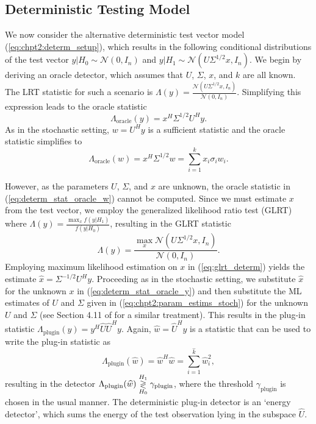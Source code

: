 \subsection{Deterministic Testing Model}\label{sec:ieee_msd_plugin_determ}
We now consider the alternative deterministic test vector model (\ref{eq:chpt2:determ_setup}), which results in the following conditional distributions of the test vector $y|H_0\sim\mathcal{N}(0,I_n)$ and $y|H_1\sim\mathcal{N}(U\Sigma^{1/2} x, I_n)$. We begin by deriving an oracle detector, which assumes that $U$, $\Sigma$, $x$, and $k$ are all known. The LRT statistic for such a scenario is $\Lambda(y) = \frac{\mathcal{N}(U\Sigma^{1/2} x, I_n)}{\mathcal{N}(0,I_n)}$. Simplifying this expression leads to the oracle statistic
\begin{equation}\label{eq:determ_stat_oracle_y}
\Lambda_{\text{oracle}}(y) = x^H\Sigma^{1/2}U^Hy.
\end{equation}
As in the stochastic setting, $w=U^Hy$ is a sufficient statistic and the oracle statistic simplifies to
\begin{equation}\label{eq:determ_stat_oracle_w}
\boxed{\Lambda_{\text{oracle}}(w) = x^H\Sigma^{1/2}w = \sum_{i=1}^kx_i\sigma_iw_i.}
\end{equation}

However, as the parameters $U$, $\Sigma$, and $x$  are unknown, the oracle statistic in (\ref{eq:determ_stat_oracle_w}) cannot be computed. Since we must estimate $x$ from the test vector, we employ the generalized likelihood ratio test (GLRT) where $\Lambda(y) = \frac{\max_x f(y|H_1)}{f(y|H_0)}$, resulting in the GLRT statistic
\begin{equation}\label{eq:glrt_determ}
\Lambda(y)=\frac{\max_x\mathcal{N}(U\Sigma^{1/2} x,I_n)}{\mathcal{N}(0,I_n)}.
\end{equation}
Employing maximum likelihood estimation on $x$ in (\ref{eq:glrt_determ}) yields the estimate $\widehat{x}=\Sigma^{-1/2}U^Hy$.  Proceeding as in the stochastic setting, we substitute $\widehat{x}$ for the unknown $x$ in (\ref{eq:determ_stat_oracle_y}) and then substitute the ML estimates of $U$ and $\Sigma$ given in (\ref{eq:chpt2:param_estims_stoch}) for the unknown $U$ and $\Sigma$ (see Section 4.11 of \cite{scharf1991statistical} for a similar treatment). This results in the plug-in statistic $\Lambda_{\text{plugin}}(y) = y^H\widehat{U}\widehat{U}^Hy$. Again, $\widehat{w}=\widehat{U}^Hy$ is a statistic that can be used to write the plug-in statistic as
\begin{equation}\label{eq:plugin_stat_determ}
\boxed{\Lambda_{\text{plugin}}(\widehat{w}) = \widehat{w}^H\widehat{w}=\sum_{i=1}^{\widehat{k}}\widehat{w}_i^2},
\end{equation}
resulting in the detector $\Lambda_{\text{plugin}}(\widehat{w}) \overset{H_1}{\underset{H_0}{\gtrless}} \gamma_{\text{plugin}}$, 
where the threshold $\gamma_{\text{plugin}}$ is chosen in the usual manner. The deterministic plug-in detector is an `energy detector', which sums the energy of the test observation lying in the subspace $\widehat{U}$.

